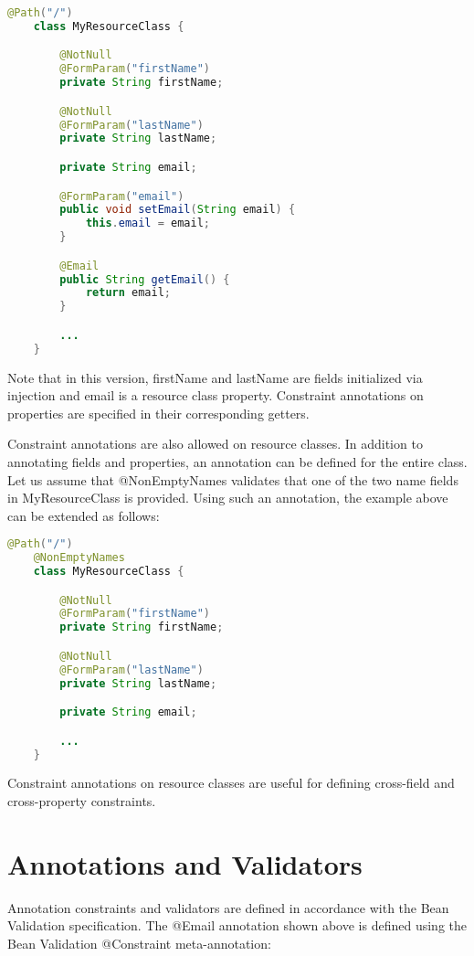 \begin{lstlisting}[language=Java]
    @Path("/")
    class MyResourceClass {

        @NotNull
        @FormParam("firstName")
        private String firstName;

        @NotNull
        @FormParam("lastName")
        private String lastName;

        private String email;

        @FormParam("email")
        public void setEmail(String email) {
            this.email = email;
        }

        @Email
        public String getEmail() {
            return email;
        }

        ...
    }
\end{lstlisting}

Note that in this version, firstName and lastName are fields initialized via injection and
email is a resource class property. Constraint annotations on properties are specified in their
corresponding getters.

Constraint annotations are also allowed on resource classes. In addition to annotating fields and properties, an
annotation can be defined for the entire class. Let us assume that @NonEmptyNames validates that one of the
two name fields in MyResourceClass is provided. Using such an annotation, the example above can be extended
as follows:

\begin{lstlisting}[language=Java]
    @Path("/")
    @NonEmptyNames
    class MyResourceClass {

        @NotNull
        @FormParam("firstName")
        private String firstName;

        @NotNull
        @FormParam("lastName")
        private String lastName;

        private String email;

        ...
    }
\end{lstlisting}

Constraint annotations on resource classes are useful for defining cross-field and cross-property constraints.

\section{Annotations and Validators}
\label{annotations_and_validators}

Annotation constraints and validators are defined in accordance with the Bean Validation specification. The
@Email annotation shown above is defined using the Bean Validation @Constraint
meta-annotation:

